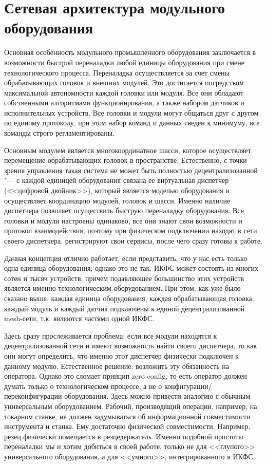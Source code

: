 \section{Сетевая архитектура модульного оборудования}\label{sec:ch3/sec2}

Основная особенность модульного промышленного оборудования заключается в возможности быстрой переналадки любой единицы оборудования при смене технологического процесса. Переналадка осуществляется за счет смены обрабатывающих головок и внешних модулей.  Это достигается посредством максимальной автономности каждой головки или модуля. Все они обладают собственными алгоритмами функционирования, а также набором датчиков и исполнительных устройств. Все головки и модули могут общаться друг с другом по единому протоколу, при этом набор команд и данных сведен к минимуму, все команды строго регламентированы.

Основным модулем является многокоординатное шасси, которое осуществляет перемещение обрабатывающих головок в пространстве. Естественно, с точки зрения управления такая система не может быть полностью децентрализованной "--- с каждой единицей оборудования связана ее виртуальная диспетчер (<<цифровой двойник>>), который является моделью оборудования и осуществляет координацию модулей, головок и шасси. Именно наличие диспетчера позволяет осуществить быструю переналадку оборудования. Все головки и модули настроены одинаково, все они знают свои возможности и протокол взаимодействия, поэтому при физическом подключении находят в сети своего диспетчера, регистрируют свои сервисы, после чего сразу готовы к работе.

Данная концепция отлично работает, если представить, что у нас есть только одна единица оборудования, однако это не так. ИКФС может состоять из многих сотен и тысяч устройств, причем подавляющее большинство этих устройств является именно технологическим оборудованием. При этом, как уже было сказано выше, каждая единица оборудования, каждая обрабатывающая головка, каждый модуль и каждый датчик подключены к единой децентрализованной mesh-сети, т.\:к. являются частями одной ИКФС.

Здесь сразу прослеживается проблема: если все модули находятся к децентрализованной сети и имеют возможность найти своего диспетчера, то как они могут определить, что именно этот диспетчер физически подключен к данному модулю. Естественное решение: возложить эту обязанность на оператора. Однако это сломает принцип zero config, то есть оператор должен думать только о технологическом процессе, а не о конфигурации/переконфигурации оборудования. Здесь можно привести аналогию с обычным универсальным оборудованием. Рабочий, производящий операции, например, на токарном станке, не должен задумываться об информационной совместимости инструмента и станка. Ему достаточно физической совместимости. Например, резец физически помещается в резцедержатель. Именно подобной простоты переналадки мы и хотим добиться в своей работе, только не для <<глупого>> универсального оборудования, а для <<умного>>, интегрированного в ИКФС.

